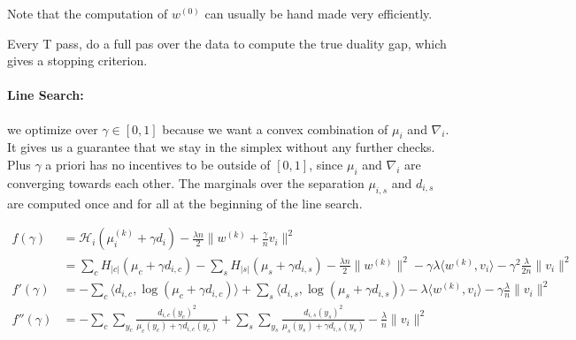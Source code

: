 \documentclass{article}
\begin{document}
Note that the computation of $w^{(0)}$ can usually be hand made very efficiently.

Every T pass, do a full pas over the data to compute the true duality gap, which gives a stopping criterion.

\paragraph{Line Search:} we optimize over $\gamma \in [0,1]$ because we want a convex combination of $\mu_i$ and $\nabla_i$.
It gives us a guarantee that we stay in the simplex without any further checks.
Plus $\gamma$ a priori has no incentives to be outside of $[0,1]$, since $\mu_i$ and $\nabla_i$ are converging towards each other.
The marginals over the separation $\mu_{i, s}$ and $d_{i, s}$ are computed once and for all at the beginning of the line search.

\begin{align*}
	f(\gamma)
	& = \mathcal H_i(\mu_i^{(k)} + \gamma d_i) 
	- \frac{\lambda n}{2} \| w^{(k)} + \frac{\gamma}{n} v_i \|^2 
	\\
	& =  \sum_c H_{|c|}(\mu_c + \gamma d_{i, c}) 
	- \sum_s H_{|s|}(\mu_s + \gamma d_{i, s}) 
	- \frac{\lambda n}{2} \| w^{(k)}\|^2 
	- \gamma \lambda  \langle w^{(k)} , v_i \rangle 
	- \gamma^2 \frac{\lambda}{2n} \|v_i \|^2 
	\\
	f'(\gamma) & =  - \sum_c \langle d_{i, c}, \log(\mu_c + \gamma d_{i, c}) \rangle 
	+ \sum_s \langle d_{i, s} , \log(\mu_s + \gamma d_{i, s}) \rangle 
	- \lambda  \langle w^{(k)} , v_i \rangle 
	- \gamma \frac{\lambda}{n} \|v_i \|^2 
	\\
	f''(\gamma) & = - \sum_c \sum_{y_c} \frac{d_{i, c}(y_c)^2 }{ \mu_c(y_c) + \gamma d_{i, c}(y_c) }
	+ \sum_s \sum_{y_s} \frac{d_{i, s}(y_s)^2 }{ \mu_s(y_s) + \gamma d_{i, s}(y_s) }
	- \frac{\lambda}{n} \|v_i \|^2 
\end{align*}




\end{document}
